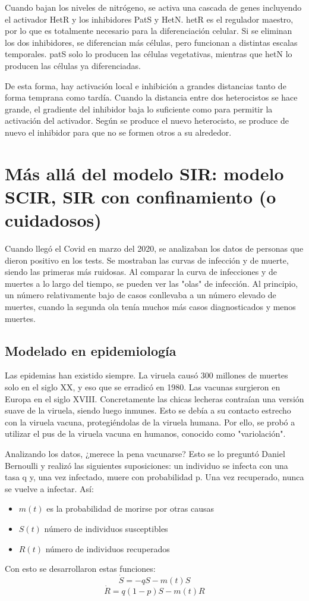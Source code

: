 \documentclass[nochap]{config/ejercicios}
\begin{document}
Cuando bajan los niveles de nitrógeno, se activa una cascada de genes incluyendo el activador HetR y los inhibidores PatS y HetN. hetR es el regulador maestro, por lo que es totalmente necesario para la diferenciación celular. Si se eliminan los dos inhibidores, se diferencian más células, pero funcionan a distintas escalas temporales. patS solo lo producen las células vegetativas, mientras que hetN lo producen las células ya diferenciadas. 

De esta forma, hay activación local e inhibición a grandes distancias tanto de forma temprana como tardía. Cuando la distancia entre dos heterocistos se hace grande, el gradiente del inhibidor baja lo suficiente como para permitir la activación del activador. Según se produce el nuevo heterocisto, se produce de nuevo el inhibidor para que no se formen otros a su alrededor. 

\newpage
\section{Más allá del modelo SIR: modelo SCIR, SIR con confinamiento (o cuidadosos)}
Cuando llegó el Covid en marzo del 2020, se analizaban los datos de personas que dieron positivo en los tests. Se mostraban las curvas de infección y de muerte, siendo las primeras más ruidosas. Al comparar la curva de infecciones y de muertes a lo largo del tiempo, se pueden ver las "olas" de infección. Al principio, un número relativamente bajo de casos conllevaba a un número elevado de muertes, cuando la segunda ola tenía muchos más casos diagnosticados y menos muertes. 

\subsection{Modelado en epidemiología}
Las epidemias han existido siempre. La viruela causó 300 millones de muertes solo en el siglo XX, y eso que se erradicó en 1980. Las vacunas surgieron en Europa en el siglo XVIII. Concretamente las chicas lecheras contraían una versión suave de la viruela, siendo luego inmunes. Esto se debía a su contacto estrecho con la viruela vacuna, protegiéndolas de la viruela humana. Por ello, se probó a utilizar el pus de la viruela vacuna en humanos, conocido como "variolación". 

Analizando los datos, ¿merece la pena vacunarse? Esto se lo preguntó Daniel Bernoulli y realizó las siguientes suposiciones: un individuo se infecta con una tasa q y, una vez infectado, muere con probabilidad p. Una vez recuperado, nunca se vuelve a infectar. Así:
\begin{itemize}
\item $m(t)$ es la probabilidad de morirse por otras causas
\item $S(t)$ número de individuos susceptibles
\item $R(t)$ número de individuos recuperados
\end{itemize}
Con esto se desarrollaron estas funciones:
$$\dot{S} = -qS - m(t)S$$
$$\dot{R} = q(1 - p)S - m(t)R$$
\end{document}
